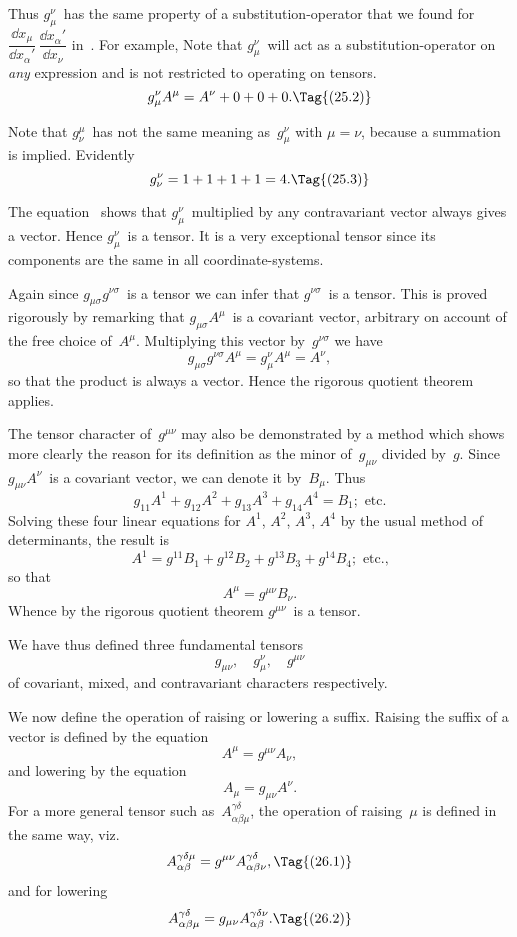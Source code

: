 \documentclass[12pt]{book}
\begin{document}
Thus $g_{\mu}^{\nu}$~has the same property of a substitution\hyp{}operator that we found
%
for $\dfrac{\dd x_{\mu}}{\dd x_{\alpha}'}\, \dfrac{\dd x_{\alpha}'}{\dd x_{\nu}}$ in~. For example\footnotemark,\footnotetext
  {Note that $g_{\mu}^{\nu}$~will act as a substitution\hyp{}operator on \emph{any} expression and is not restricted to
  operating on tensors.}
\[
g_{\mu}^{\nu} A^{\mu} = A^{\nu} + 0 + 0 + 0.
\Tag{(25.2)}
\]

Note that $g_{\nu}^{\mu}$~has not the same meaning as~$g_{\mu}^{\nu}$ with $\mu = \nu$, because a
summation is implied. Evidently
\[
g_{\nu}^{\nu} = 1 + 1 + 1 +1 = 4.
\Tag{(25.3)}
\]

The equation~ shows that $g_{\mu}^{\nu}$~multiplied by any contravariant vector
always gives a vector. Hence $g_{\mu}^{\nu}$~is a tensor. It is a very exceptional tensor
since its components are the same in all coordinate\hyp{}systems.

Again since $g_{\mu\sigma}g^{\nu\sigma}$~is a tensor we can infer that $g^{\nu\sigma}$~is a tensor. This is
proved rigorously by remarking that $g_{\mu\sigma} A^{\mu}$~is a covariant vector, arbitrary
on account of the free choice of~$A^{\mu}$. Multiplying this vector by~$g^{\nu\sigma}$ we have
\[
g_{\mu\sigma} g^{\nu\sigma} A^{\mu} = g_{\mu}^{\nu} A^{\mu} = A^{\nu},
\]
so that the product is always a vector. Hence the rigorous quotient theorem
applies.

The tensor character of~$g^{\mu\nu}$ may also be demonstrated by a method which
shows more clearly the reason for its definition as the minor of~$g_{\mu\nu}$ divided by~$g$.
Since $g_{\mu\nu} A^{\nu}$~is a covariant vector, we can denote it by~$B_{\mu}$. Thus
\[
g_{11} A^{1} + g_{12} A^{2} + g_{13} A^{3} + g_{14} A^{4} = B_{1}; \text{ etc.}
\]
Solving these four linear equations for $A^{1}$, $A^{2}$, $A^{3}$, $A^{4}$ by the usual method of
determinants, the result is
\[
A^{1} = g^{11} B_{1} + g^{12} B_{2} + g^{13} B_{3} + g^{14} B_{4}; \text{ etc.,}
\]
so that
\[
A^{\mu} = g^{\mu\nu} B_{\nu}.
\]
Whence by the rigorous quotient theorem $g^{\mu\nu}$~is a tensor.

We have thus defined three fundamental tensors
\[
g_{\mu\nu},\quad
g_{\mu}^{\nu},\quad
g^{\mu\nu}
\]
of covariant, mixed, and contravariant characters respectively.

%

We now define the operation of raising or lowering a suffix. Raising the
%
suffix of a vector is defined by the equation
\[
A^{\mu} = g^{\mu\nu} A_{\nu},
\]
and lowering by the equation
\[
A_{\mu} = g_{\mu\nu} A^{\nu}.
\]
For a more general tensor such as~$A_{\alpha\beta\mu}^{\gamma\delta}$, the operation of raising~$\mu$ is defined
in the same way, viz.\
\[
A_{\alpha\beta}^{\gamma\delta\mu} = g^{\mu\nu} A_{\alpha\beta\nu}^{\gamma\delta},
\Tag{(26.1)}
\]
and for lowering
\[
A_{\alpha\beta\mu}^{\gamma\delta} = g_{\mu\nu} A_{\alpha\beta}^{\gamma\delta\nu}.
\Tag{(26.2)}
\]
\end{document}
